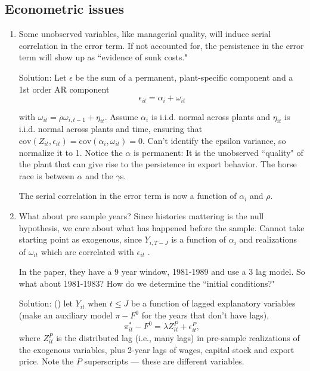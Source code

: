 \documentclass[11pt, pdftex]{article}
\newcommand{\cov}{\mathrm{cov}}
\begin{document}
\subsection*{Econometric issues}
\begin{enumerate}
  \item Some unobserved variables, like managerial quality, will induce serial correlation in the error term.  If not accounted for, the persistence in the error term will show up as ``evidence of sunk costs."

      Solution: Let $\epsilon$  be the sum of a permanent, plant-specific component and a 1st order AR component
    \begin{equation}
        \epsilon_{it} = \alpha_{i} + \omega_{it}
    \end{equation}

with  $\omega_{it}=\rho \omega_{i,t-1}+\eta_{it}$.  Assume $\alpha_i$  is i.i.d. normal across plants and  $\eta_{it}$  is i.i.d. normal across plants and time, ensuring that $\cov(Z_{it},\epsilon_{it})=\cov(\alpha_i,\omega_{it})=0$.   Can't identify the epsilon variance, so normalize it to 1.  Notice the $\alpha$ is permanent: It is the unobserved ``quality" of the plant that can give rise to the persistence in export behavior.  The horse race is between $\alpha$ and the $\gamma$s.

The serial correlation in the error term is now a function of $\alpha_i$  and  $\rho$.

\item What about pre sample years?  Since histories mattering is the null hypothesis, we care about what has happened before the sample.  Cannot take starting point as exogenous, since $Y_{i,T-J}$  is a function of $\alpha_i$  and realizations of $\omega_{it}$  which are correlated with $\epsilon_{it}$ .

In the paper, they have a 9 year window, 1981-1989 and use a 3 lag model.  So what about 1981-1983? How do we determine the ``initial conditions?"

Solution: (\cite{heckman}) let $Y_{it}$ when $t\leq J$  be a function of lagged explanatory variables (make an auxiliary model $\pi-F^0$ for the years that don't have lags),
\begin{equation}
    \pi^*_{it}-F^0=\lambda Z_{it}^P+\epsilon_{it}^P,
\end{equation}
where $Z_{it}^P$ is the distributed lag (i.e., many lags) in pre-sample realizations of the exogenous variables, plus 2-year lags of wages, capital stock and export price. Note the $P$ superscripts --- these are different variables.


\end{enumerate}
\end{document}
